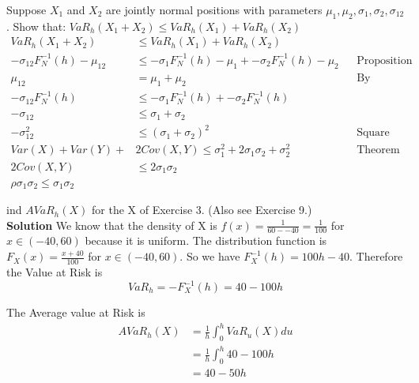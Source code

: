 \documentclass[12pt]{article}
\newenvironment{problem}[3][Problem]{\begin{trivlist}
\item[\hskip \labelsep {\bfseries #1}\hskip \labelsep {\bfseries #2.}]}{\end{trivlist}}
\begin{document}
\begin{problem}{5}.  Suppose $X_1$ and $X_2$ are jointly normal positions with parameters $\mu_1,\mu_2,\sigma_1,\sigma_2,\sigma_{12}$. Show that: $ VaR_h(X_1 +X_2) \leq VaR_h(X_1) + VaR_h(X_2)$
\begin{align*} 
VaR_h(X_1 +X_2) &\leq VaR_h(X_1) + VaR_h(X_2) \\
-\sigma_{12} F_N^{-1}(h) - \mu_{12} &\leq -\sigma_{1} F_N^{-1}(h) - \mu_{1} + -\sigma_{2} F_N^{-1}(h) - \mu_{2}  && \text{Proposition 1 in notes} \\
\mu_{12} &= \mu_1 + \mu_2 && \text{By Theorem 3.9.2. Thus:} \\
-\sigma_{12} F_N^{-1}(h) &\leq -\sigma_{1} F_N^{-1}(h) + -\sigma_{2} F_N^{-1}(h) \\
-\sigma_{12} &\leq \sigma_1 + \sigma_2  \\ 
-\sigma_{12}^2 &\leq (\sigma_1 + \sigma_2)^2 && \text{Square both sides}  \\ 
Var(X) + Var(Y) + &2Cov(X,Y) \leq \sigma_1^2 + 2\sigma_1\sigma_2 + \sigma_2^2  &&\text{Theorem 3.9.5}\\
2Cov(X,Y) &\leq 2\sigma_1\sigma_2 \\
\rho \sigma_1\sigma_2 \leq \sigma_1\sigma_2 
\end{align*} 
\end{problem}
\newpage
\begin{problem}{6}   Find $AVaR_h(X)$ for the X of Exercise 3. (Also see Exercise 9.) 	 \\
\textbf{Solution} We know that the density of X is $f(x) = \frac{1}{60--40} = \frac{1}{100}$ for $x \in (-40,60)$ because it is uniform. The distribution function is $F_X(x) = \frac{x+40}{100}$ for $ x \in (-40,60)$. So we have $F_X^{-1}(h) = 100h - 40.$ Therefore the Value at Risk is $$ VaR_h = -F_X^{-1}(h) = 40-100h$$

The Average value at Risk is 
\begin{align*}
 AVaR_h(X) &= \frac{1}{h} \int_0^hVaR_u(X)du \\
 &= \frac{1}{h} \int_0^h  40-100h \\
 &= 40-50h
 \end{align*}

\end{problem}
\end{document}
